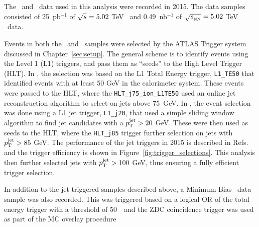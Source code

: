 
The \PbPb\ and \pp\ data used in this analysis were recorded in 2015.
The data samples consisted of 25~pb$^{-1}$ of $\mbox{$\sqrt{s}$}=5.02$ TeV \pp\ and 0.49~nb$^{-1}$ of $\mbox{$\sqrt{s_{_\text{NN}}}$} =5.02$ TeV \pbpb\ data.


Events in both the \pp\ and \pbpb\ samples were selected by the ATLAS Trigger system discussed in Chapter~\ref{sec:setup}.
The general scheme is to identify events using the Level 1 (L1) triggers, and pass them as ``seeds'' to the High Level Trigger (HLT).
In \pbpb, the selection was based on the L1 Total Energy trigger, \texttt{L1\_TE50} that identified events with at least 50 GeV in the calorimeter system.
These events were passed to the HLT, where the \texttt{HLT\_j75\_ion\_L1TE50} used an online jet reconstruction algorithm to select on jets above \mbox{75 GeV}.
In \pp, the event selection was done using a L1 jet trigger, \texttt{L1\_j20}, that used a simple sliding window algorithm to find jet candidates with a $\mbox{$p_{\mathrm{T}}^{\mathrm{jet}}$} > 20$ GeV.
These were then used as seeds to the HLT, where the \texttt{HLT\_j85} trigger further selection on jets with $\mbox{$p_{\mathrm{T}}^{\mathrm{jet}}$} > 85$ GeV.
The performance of the jet triggers in 2015 is described in Refs.~\cite{HITMF, Aaboud:2016leb} and the trigger efficiency is shown in Figure~\ref{fig:trigger_selections}.
This analysis then further selected jets with $\mbox{$p_{\mathrm{T}}^{\mathrm{jet}}$} > 100$ GeV, thus ensuring a fully efficient trigger selection.

In addition to the jet triggered samples described above, a Minimum Bias \pbpb\ data sample was also recorded.
This was triggered based on a logical OR of the total energy trigger with a threshold of 50~\GeV\ and the ZDC coincidence trigger was used as part of the MC overlay procedure



